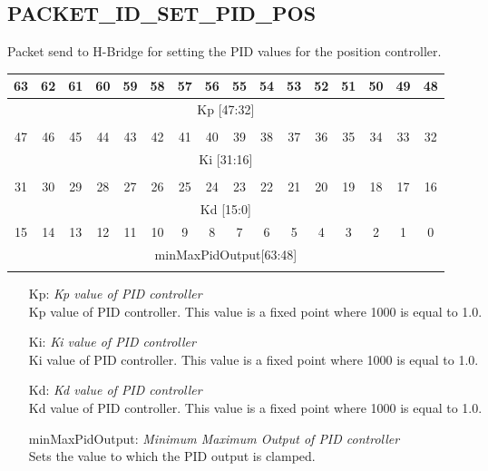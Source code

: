\documentclass{article}
\begin{document}
\subsection{PACKET\_ID\_SET\_PID\_POS}
Packet send to H-Bridge for setting the PID values for the position controller.
\begin{tabular} { c c c c c c c c c c c c c c c c}
  63&62&61&60&59&58&57&56&55&54&53&52&51&50&49&48\\
  \hline
  \multicolumn{16}{|c|}{Kp [47:32]} \\ 
  \hline
  \multicolumn{16}{c}{} \\
  47&46&45&44&43&42&41&40&39&38&37&36&35&34&33&32\\
  \hline
  \multicolumn{16}{|c|}{Ki [31:16]} \\ 
  \hline
  \multicolumn{16}{c}{} \\
  31&30&29&28&27&26&25&24&23&22&21&20&19&18&17&16\\
  \hline
  \multicolumn{16}{|c|}{Kd [15:0]} \\ 
  \hline
  \hline
  15&14&13&12&11&10&9&8&7&6&5&4&3&2&1&0\\
  \hline
  \multicolumn{16}{|c|}{ minMaxPidOutput[63:48]}\\ 
  \hline
  \multicolumn{16}{c}{} \\
\end{tabular}
\begin{itemize}
  \item[Kp: ] {\it Kp value of PID controller}\\
    Kp value of PID controller. This value is a fixed point where 1000
    is equal to 1.0.

  \item[Ki: ] {\it Ki value of PID controller}\\
    Ki value of PID controller. This value is a fixed point where 1000
    is equal to 1.0.

  \item[Kd: ] {\it Kd value of PID controller}\\
    Kd value of PID controller. This value is a fixed point where 1000
    is equal to 1.0.
  \item[minMaxPidOutput: ] {\it Minimum Maximum Output of PID controller}\\
    Sets the value to which the PID output is clamped.
\end{itemize}
\end{document}
